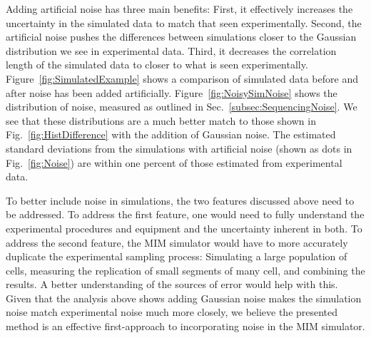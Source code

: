 		Adding artificial noise has three main benefits:
		First, it effectively increases the uncertainty in the simulated data to match that seen experimentally.
		Second, the artificial noise pushes the differences between simulations closer to the Gaussian distribution we see in experimental data.
		Third, it decreases the correlation length of the simulated data to closer to what is seen experimentally.
		Figure~\ref{fig:SimulatedExample} shows a comparison of simulated data before and after noise has been added artificially.
		Figure~\ref{fig:NoisySimNoise} shows the distribution of noise, measured as outlined in Sec.~\ref{subsec:SequencingNoise}.
		We see that these distributions are a much better match to those shown in Fig.~\ref{fig:HistDifference} with the addition of Gaussian noise.
		The estimated standard deviations from the simulations with artificial noise (shown as dots in Fig.~\ref{fig:Noise}) are within one percent of those estimated from experimental data.

		To better include noise in simulations, the two features discussed above need to be addressed.
		To address the first feature, one would need to fully understand the experimental procedures and equipment and the uncertainty inherent in both.
		To address the second feature, the MIM simulator would have to more accurately duplicate the experimental sampling process:
		Simulating a large population of cells, measuring the replication of small segments of many cell, and combining the results.
		A better understanding of the sources of error would help with this.
		Given that the analysis above shows adding Gaussian noise makes the simulation noise match experimental noise much more closely, we believe the presented method is an effective first-approach to incorporating noise in the MIM simulator.









































